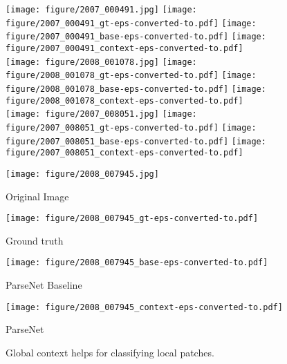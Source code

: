 \documentclass{article} \usepackage{iclr2016_conference}
\begin{document}
\captionsetup[subfigure]{singlelinecheck=off,justification=raggedright}
\begin{figure}
	\centering
	\texttt{[image: figure/2007\_000491.jpg]}
	\texttt{[image: figure/2007\_000491\_gt-eps-converted-to.pdf]}
	\texttt{[image: figure/2007\_000491\_base-eps-converted-to.pdf]}
	\texttt{[image: figure/2007\_000491\_context-eps-converted-to.pdf]}\\
	\texttt{[image: figure/2008\_001078.jpg]}
	\texttt{[image: figure/2008\_001078\_gt-eps-converted-to.pdf]}
	\texttt{[image: figure/2008\_001078\_base-eps-converted-to.pdf]}
	\texttt{[image: figure/2008\_001078\_context-eps-converted-to.pdf]}\\
	\texttt{[image: figure/2007\_008051.jpg]}
	\texttt{[image: figure/2007\_008051\_gt-eps-converted-to.pdf]}
	\texttt{[image: figure/2007\_008051\_base-eps-converted-to.pdf]}
	\texttt{[image: figure/2007\_008051\_context-eps-converted-to.pdf]}\\
	\begin{subtable}[b]{0.24\linewidth}
		\texttt{[image: figure/2008\_007945.jpg]}
		\caption{Original Image}
	\end{subtable}
	\begin{subtable}[b]{0.24\linewidth}
		\texttt{[image: figure/2008\_007945\_gt-eps-converted-to.pdf]}
		\caption{Ground truth}
	\end{subtable}
	\begin{subtable}[b]{0.24\linewidth}
		\texttt{[image: figure/2008\_007945\_base-eps-converted-to.pdf]}
		\caption{ParseNet Baseline}
	\end{subtable}
	\begin{subtable}[b]{0.24\linewidth}
		\texttt{[image: figure/2008\_007945\_context-eps-converted-to.pdf]}
		\caption{ParseNet}
	\end{subtable}
	\caption{Global context helps for classifying local patches.}
	\label{fig:globalcontexthelps}
\end{figure}
\end{document}
